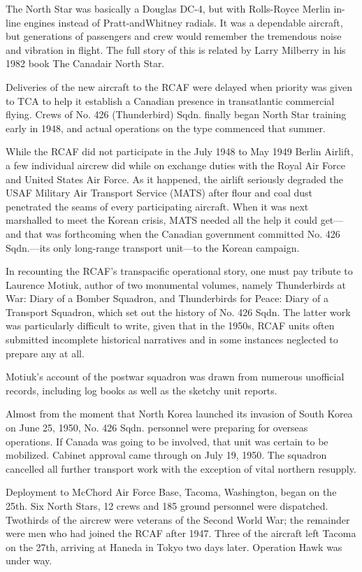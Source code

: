 The North Star was basically a Douglas DC-4, but with Rolls-Royce
Merlin in-line engines instead of Pratt-andWhitney radials. It was a
dependable aircraft, but generations of passengers and crew would
remember the tremendous noise and vibration in flight. The full story
of this is related by Larry Milberry in his 1982 book The Canadair
North Star.

Deliveries of the new aircraft to the RCAF were delayed when
priority was given to TCA to help it establish a Canadian presence in
transatlantic commercial flying. Crews of No. 426 (Thunderbird)
Sqdn. finally began North Star training early in 1948, and actual
operations on the type commenced that summer.

While the RCAF did not participate in the July 1948 to May 1949 Berlin
Airlift, a few individual aircrew did while on exchange duties with
the Royal Air Force and United States Air Force. As it happened, the
airlift seriously degraded the USAF Military Air Transport Service
(MATS) after flour and coal dust penetrated the seams of every
participating aircraft. When it was next marshalled to meet the Korean
crisis, MATS needed all the help it could get—and that was forthcoming
when the Canadian government committed No. 426 Sqdn.—its only
long-range transport unit—to the Korean campaign.

In recounting the RCAF’s transpacific operational story, one must pay
tribute to Laurence Motiuk, author of two monumental volumes, namely
Thunderbirds at War: Diary of a Bomber Squadron, and Thunderbirds for
Peace: Diary of a Transport Squadron, which set out the history of
No. 426 Sqdn. The latter work was particularly difficult to write,
given that in the 1950s, RCAF units often submitted incomplete
historical narratives and in some instances neglected to prepare any
at all.

Motiuk’s account of the postwar squadron was drawn from numerous
unofficial records, including log books as well as the sketchy unit
reports.

Almost from the moment that North Korea launched its invasion of South
Korea on June 25, 1950, No. 426 Sqdn. personnel were preparing for
overseas operations. If Canada was going to be involved, that unit was
certain to be mobilized. Cabinet approval came through on July 19,
1950. The squadron cancelled all further transport work with the
exception of vital northern resupply.

Deployment to McChord Air Force Base, Tacoma, Washington, began on the
25th. Six North Stars, 12 crews and 185 ground personnel were
dispatched. Twothirds of the aircrew were veterans of the Second
World War; the remainder were men who had joined the RCAF after
1947. Three of the aircraft left Tacoma on the 27th, arriving at
Haneda in Tokyo two days later. Operation Hawk was under way.

